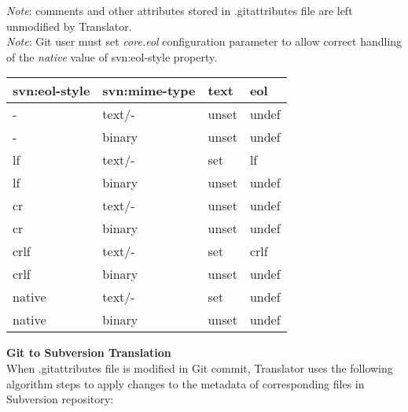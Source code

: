 \emph{Note}: comments and other attributes stored in .gitattributes file are left unmodified by Translator.\\
\emph{Note}: Git user must set \emph{core.eol} configuration parameter to allow correct handling of the \emph{native} value of svn:eol-style property.

\begin{center}
\begin{tabular}{ | p{} | p{} | p{} | p{} |}
	\hline
	svn:eol-style &   svn:mime-type &   text  & eol \\ \hline \hline
	-             &   text\footnotemark[1]/-        &   unset & undef \\ \hline
	-             &   binary\footnotemark[1]        &   unset & undef \\ \hline
	lf            &   text/-        &   set   & lf \\ \hline
	lf            &   binary        &   unset & undef \\ \hline
	cr            &   text/-        &   unset & undef  \footnotemark[2] \\ \hline
	cr            &   binary        &   unset & undef \\ \hline
	crlf          &   text/-        &   set   & crlf \\ \hline
	crlf          &   binary        &   unset & undef \\ \hline
	native        &   text/-        &   set   & undef \footnotemark[3] \\ \hline
	native        &   binary        &   unset & undef \\ \hline
\end{tabular}
\label{eol_mime_svn_to_git}
\end{center}
\newpage
\textbf{Git to Subversion Translation}\\

When .gitattributes file is modified in Git commit, Translator uses the following algorithm steps to apply changes to the metadata of corresponding files in Subversion repository:

